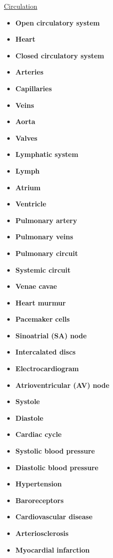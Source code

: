 \documentclass[12pt,letterpaper]{article}
\begin{document}
\hypertarget{42.5}{}
\begin{secbox}{\hyperlink{42}{Circulation}}{
    \begin{itemize}
        \item \textbf{Open circulatory system}
        \item \textbf{Heart}
        \item \textbf{Closed circulatory system}
        \item \textbf{Arteries}
        \item \textbf{Capillaries}
        \item \textbf{Veins}
        \item \textbf{Aorta}
        \item \textbf{Valves}
        \item \textbf{Lymphatic system}
        \item \textbf{Lymph}
        \item \textbf{Atrium}
        \item \textbf{Ventricle}
        \item \textbf{Pulmonary artery}
        \item \textbf{Pulmonary veins}
        \item \textbf{Pulmonary circuit}
        \item \textbf{Systemic circuit}
        \item \textbf{Venae cavae}
        \item \textbf{Heart murmur}
        \item \textbf{Pacemaker cells}
        \item \textbf{Sinoatrial (SA) node}
        \item \textbf{Intercalated discs}
        \item \textbf{Electrocardiogram}
        \item \textbf{Atrioventricular (AV) node}
        \item \textbf{Systole}
        \item \textbf{Diastole}
        \item \textbf{Cardiac cycle}
        \item \textbf{Systolic blood pressure}
        \item \textbf{Diastolic blood pressure}
        \item \textbf{Hypertension}
        \item \textbf{Baroreceptors}
        \item \textbf{Cardiovascular disease}
        \item \textbf{Arteriosclerosis}
        \item \textbf{Myocardial infarction}
    \end{itemize}
}\end{secbox}
\end{document}
